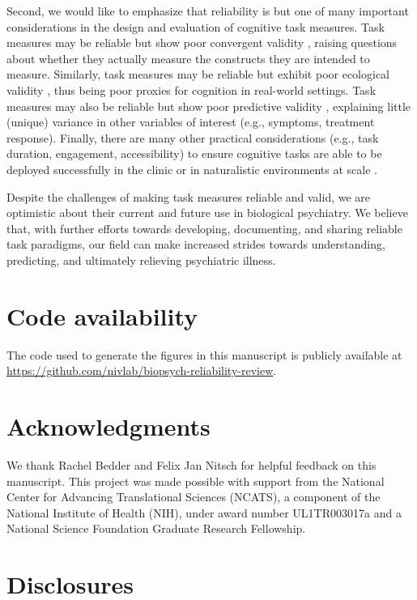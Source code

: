 \documentclass[a4paper,12pt]{article}
\begin{document}
Second, we would like to emphasize that reliability is but one of many important considerations in the design and evaluation of cognitive task measures. Task measures may be reliable but show poor convergent validity \cite{snijder2022psychometric, eckstein2022interpretation}, raising questions about whether they actually measure the constructs they are intended to measure. Similarly, task measures may be reliable but exhibit poor ecological validity \cite{Steiner2021-oq}, thus being poor proxies for cognition in real-world settings. Task measures may also be reliable but show poor predictive validity \cite{verdejo2021unified}, explaining little (unique) variance in other variables of interest (e.g., symptoms, treatment response). Finally, there are many other practical considerations (e.g., task duration, engagement, accessibility) to ensure cognitive tasks are able to be deployed successfully in the clinic or in naturalistic environments at scale \cite{germine2021toward}. 

Despite the challenges of making task measures reliable and valid, we are optimistic about their current and future use in biological psychiatry. We believe that, with further efforts towards developing, documenting, and sharing reliable task paradigms, our field can make increased strides towards understanding, predicting, and ultimately relieving psychiatric illness.

\section{Code availability}

The code used to generate the figures in this manuscript is publicly available at \break \url{https://github.com/nivlab/biopsych-reliability-review}.

\section{Acknowledgments}

We thank Rachel Bedder and Felix Jan Nitsch for helpful feedback on this manuscript. This project was made possible with support from the National Center for Advancing Translational Sciences (NCATS), a component of the National Institute of Health (NIH), under award number UL1TR003017a and a National Science Foundation Graduate Research Fellowship.

\section{Disclosures}
\end{document}
